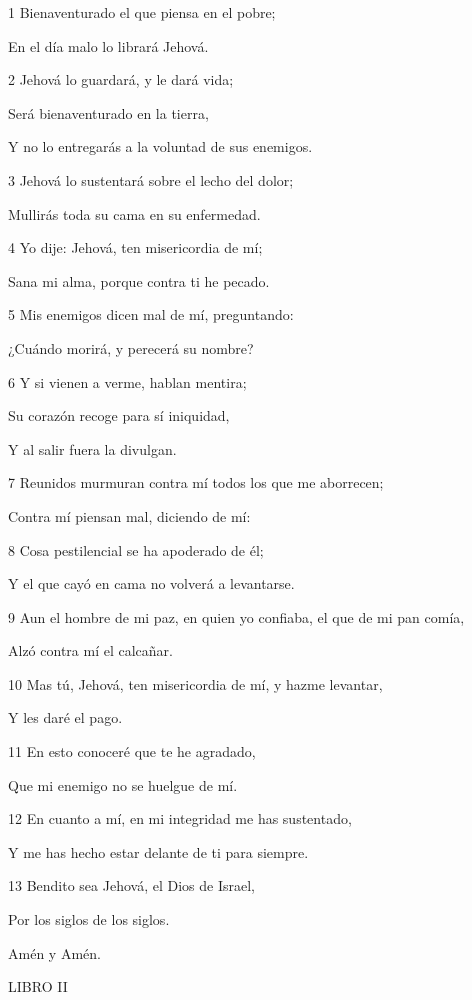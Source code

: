 \par 1 Bienaventurado el que piensa en el pobre;
\par En el día malo lo librará Jehová.
\par 2 Jehová lo guardará, y le dará vida;
\par Será bienaventurado en la tierra,
\par Y no lo entregarás a la voluntad de sus enemigos.
\par 3 Jehová lo sustentará sobre el lecho del dolor;
\par Mullirás toda su cama en su enfermedad.
\par 4 Yo dije: Jehová, ten misericordia de mí;
\par Sana mi alma, porque contra ti he pecado.
\par 5 Mis enemigos dicen mal de mí, preguntando:
\par ¿Cuándo morirá, y perecerá su nombre?
\par 6 Y si vienen a verme, hablan mentira;
\par Su corazón recoge para sí iniquidad,
\par Y al salir fuera la divulgan.
\par 7 Reunidos murmuran contra mí todos los que me aborrecen;
\par Contra mí piensan mal, diciendo de mí:
\par 8 Cosa pestilencial se ha apoderado de él;
\par Y el que cayó en cama no volverá a levantarse.
\par 9 Aun el hombre de mi paz, en quien yo confiaba, el que de mi pan comía,
\par Alzó contra mí el calcañar.
\par 10 Mas tú, Jehová, ten misericordia de mí, y hazme levantar,
\par Y les daré el pago.
\par 11 En esto conoceré que te he agradado,
\par Que mi enemigo no se huelgue de mí.
\par 12 En cuanto a mí, en mi integridad me has sustentado,
\par Y me has hecho estar delante de ti para siempre.
\par 13 Bendito sea Jehová, el Dios de Israel,
\par Por los siglos de los siglos.
\par Amén y Amén.



\par LIBRO II

